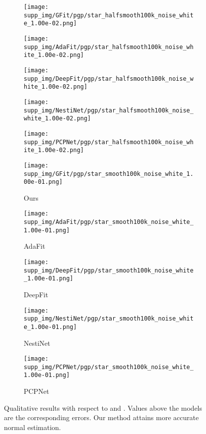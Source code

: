 \documentclass[runningheads]{llncs}
\begin{document}
\begin{figure*}
\begin{subfigure}{0.15\linewidth}
		\centering
		\texttt{[image: supp\_img/GFit/pgp/star\_halfsmooth100k\_noise\_white\_1.00e-02.png]}
\end{subfigure}
	\hspace{0.1cm}
	\begin{subfigure}{0.15\linewidth}
		\centering
		\texttt{[image: supp\_img/AdaFit/pgp/star\_halfsmooth100k\_noise\_white\_1.00e-02.png]}
\end{subfigure}
	\hspace{0.1cm}
	\begin{subfigure}{0.17\linewidth}
		\centering
		\texttt{[image: supp\_img/DeepFit/pgp/star\_halfsmooth100k\_noise\_white\_1.00e-02.png]}
\end{subfigure}
	\hspace{0.1cm}
	\begin{subfigure}{0.17\linewidth}
		\centering
		\texttt{[image: supp\_img/NestiNet/pgp/star\_halfsmooth100k\_noise\_white\_1.00e-02.png]}
\end{subfigure}
	\hspace{0.1cm}
	\begin{subfigure}{0.17\linewidth}
		\centering
		\texttt{[image: supp\_img/PCPNet/pgp/star\_halfsmooth100k\_noise\_white\_1.00e-02.png]}
\end{subfigure}
	
\begin{subfigure}{0.15\linewidth}
		\centering
		\texttt{[image: supp\_img/GFit/pgp/star\_smooth100k\_noise\_white\_1.00e-01.png]}
		\caption{Ours}
	\end{subfigure}
	\hspace{0.1cm}
	\begin{subfigure}{0.15\linewidth}
		\centering
		\texttt{[image: supp\_img/AdaFit/pgp/star\_smooth100k\_noise\_white\_1.00e-01.png]}
		\caption{AdaFit}
	\end{subfigure}
	\hspace{0.1cm}
	\begin{subfigure}{0.17\linewidth}
		\centering
		\texttt{[image: supp\_img/DeepFit/pgp/star\_smooth100k\_noise\_white\_1.00e-01.png]}
		\caption{DeepFit}
	\end{subfigure}
	\hspace{0.1cm}
	\begin{subfigure}{0.17\linewidth}
		\centering
		\texttt{[image: supp\_img/NestiNet/pgp/star\_smooth100k\_noise\_white\_1.00e-01.png]}
		\caption{NestiNet}
	\end{subfigure}
	\hspace{0.1cm}
	\begin{subfigure}{0.17\linewidth}
		\centering
		\texttt{[image: supp\_img/PCPNet/pgp/star\_smooth100k\_noise\_white\_1.00e-01.png]}
		\caption{PCPNet}
	\end{subfigure}
\caption{Qualitative results with respect to  and . Values above the models are the corresponding  errors. Our method attains more accurate normal estimation.
	}
	\label{fig:quali4}
\end{figure*}

 
\end{document}
